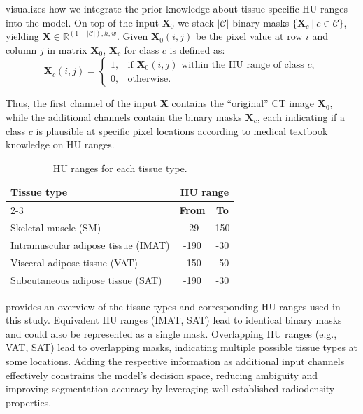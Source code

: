 \documentclass[conference]{IEEEtran}
\let\bm\mathbf
\begin{document}
 visualizes how we integrate the prior knowledge about tissue-specific HU ranges into the model.
On top of the input $\bm{X}_0$ we stack $|\mathcal{C}|$ binary masks $\{ \bm{X}_c\ |\ c \in \mathcal{C}\}$, yielding $\bm{X} \in \mathbb{R}^{(1 + |\mathcal{C}|) , h , w}$. 
Given $\bm{X}_0(i,j)$ be the pixel value at row $i$ and column $j$ in matrix $\bm{X}_0$, $\bm{X}_c$ for class $c$ is defined as:
% 
\begin{equation*}
\bm{X}_{c}(i,j)=\begin{cases}
    1, & \text{if } \bm{X}_{0}(i,j) \text{ within the HU range of class } c,\\
    0, & \text{otherwise}.
\end{cases}
\label{eq:pixel_indicator}
\end{equation*}

Thus, the first channel of the input $\bm{X}$ contains the ``original'' CT image $\bm{X}_0$, while the additional channels contain the binary masks $\bm{X}_c$, each indicating if a class $c$ is plausible at specific pixel locations according to medical textbook knowledge on HU ranges.
%
\begin{table}[t]
    \caption{HU ranges for each tissue type.}
    \begin{center}
        \begin{tabular}{lcc}
        \toprule
        \textbf{Tissue type} & \multicolumn{2}{c}{\textbf{HU range}} \\
        \cmidrule(lr){2-3}
         & \textbf{From} & \textbf{To} \\
        \midrule
        Skeletal muscle (SM) & -29 & 150 \\
        Intramuscular adipose tissue (IMAT) & -190 & -30 \\
        Visceral adipose tissue (VAT) & -150 & -50 \\
        Subcutaneous adipose tissue (SAT) & -190 & -30 \\
        \bottomrule
        \end{tabular}
    \label{tab:hu_values}
    \end{center}
\end{table}
%
 provides an overview of the tissue types and corresponding HU ranges used in this study. 
Equivalent HU ranges (IMAT, SAT) lead to identical binary masks and could also be represented as a single mask.
Overlapping HU ranges (e.g., VAT, SAT) lead to overlapping masks, indicating multiple possible tissue types at some locations.
Adding the respective information as additional input channels effectively constrains the model’s decision space, reducing ambiguity and improving segmentation accuracy by leveraging well-established radiodensity properties.
\end{document}
